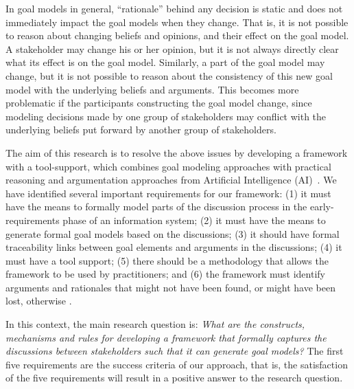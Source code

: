 \begin{enumerate}
In goal models in general, ``rationale'' behind any decision is static and does not immediately impact the goal models when they change. That is, it is not possible to reason about changing beliefs and opinions, and their effect on the goal model. A stakeholder may change his or her opinion, but it is not always directly clear what its effect is on the goal model. Similarly, a part of the goal model may change, but it is not possible to reason about the consistency of this new goal model with the underlying beliefs and arguments. This becomes more problematic if the participants constructing the goal model change, since modeling decisions made by one group of stakeholders may conflict with the underlying beliefs put forward by another group of stakeholders.
\end{enumerate}
 
The aim of this research is to resolve the above issues by developing a framework with a tool-support, which combines goal modeling approaches with practical reasoning and argumentation approaches from Artificial Intelligence (AI)~\cite{atkinson2007}. We have identified several important requirements for our framework: (1) it must have the means to formally model parts of the discussion process in the early-requirements phase of an information system; (2) it must have the means to generate formal goal models based on the discussions; (3) it should have formal traceability links between goal elements and arguments in the discussions; (4) it must have a tool support; (5) there should be a methodology that allows the framework to be used by practitioners; and (6) the framework must identify arguments and rationales that might not have been found, or might have been lost, otherwise %
 . %

In this context, the main research question is: \emph{What are the constructs, mechanisms and rules for developing a framework that formally captures the discussions between stakeholders such that it can generate goal models?} The first five requirements are the success criteria of our approach, that is, the satisfaction of the five requirements will result in a positive answer to the research question. %

